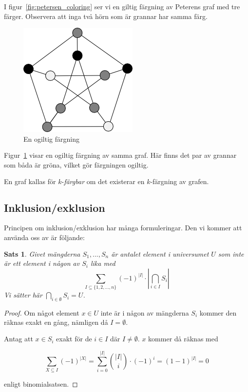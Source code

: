 \documentclass[a4paper]{report}
\newtheorem{theorem}{Sats}
\begin{document}
I figur~\ref{fig:petersen_coloring} ser vi en giltig färgning av Peterens graf med tre färger. Observera att inga två hörn som är grannar har samma färg.

\begin{figure}[h!]
\centering
\includegraphics{ogiltig_petersen}
\caption{En ogiltig färgning}
\label{fig:invalid_coloring}
\end{figure}

Figur~\ref{fig:invalid_coloring} visar en ogiltig färgning av samma graf. Här finns det par av grannar som båda är gröna, vilket gör färgningen ogiltig.

En graf kallas för $k$-\emph{färgbar} om det existerar en $k$-färgning av grafen.

\subsection{Inklusion/exklusion}

Principen om inklusion/exklusion har många formuleringar. Den vi kommer att använda oss av är följande:

\begin{theorem}
    Givet mängderna $S_1, ..., S_n$ är antalet element i universumet $U$ som inte är ett element i någon av $S_i$ lika med
    $$\sum_{I \subseteq \{1, 2, ..., n\}}{(-1)^{|I|} \cdot |\bigcap_{i\in I}{S_i}|}$$
    Vi sätter här $\bigcap_{i \in \emptyset}{S_i} = U$.
\end{theorem}
\begin{proof}
    Om något element $x \in U$ inte är i någon av mängderna $S_i$ kommer den räknas exakt en gång, nämligen då $I = \emptyset$.

    Antag att $x \in S_i$ exakt för de $i \in I$ där $I \not= \emptyset$. $x$ kommer då räknas med

    $$\sum_{X \subseteq I}{(-1)^{|X|}} = \sum_{i=0}^{|I|}{{|I| \choose i}\cdot(-1)^i} = (1-1)^{|I|} = 0$$

    enligt binomialsatsen.
\end{proof}
\end{document}
